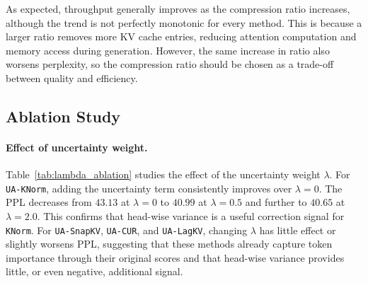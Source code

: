 \documentclass{article}
\begin{document}
\begin{table}[!htbp]
\centering
\caption{Perplexity and throughput on WikiText-2 under different compression ratios.
Lower PPL is better; higher throughput is better.}
\label{tab:ratio_study}
\end{table}
As expected, throughput generally improves as the compression ratio increases, although the trend is not perfectly monotonic for every method. This is because a larger ratio removes more KV cache entries, reducing attention computation and memory access during generation. However, the same increase in ratio also worsens perplexity, so the compression ratio should be chosen as a trade-off between quality and efficiency.
\subsection{Ablation Study}
\label{subsec:ablation}

\paragraph{Effect of uncertainty weight.}
Table~\ref{tab:lambda_ablation} studies the effect of the uncertainty weight $\lambda$.
For \texttt{UA-KNorm}, adding the uncertainty term consistently improves over $\lambda=0$.
The PPL decreases from $43.13$ at $\lambda=0$ to $40.99$ at $\lambda=0.5$ and further to $40.65$ at $\lambda=2.0$.
This confirms that head-wise variance is a useful correction signal for \texttt{KNorm}.
For \texttt{UA-SnapKV}, \texttt{UA-CUR}, and \texttt{UA-LagKV}, changing $\lambda$ has little effect or slightly worsens PPL, suggesting that these methods already capture token importance through their original scores and that head-wise variance provides little, or even negative, additional signal.
\end{document}
